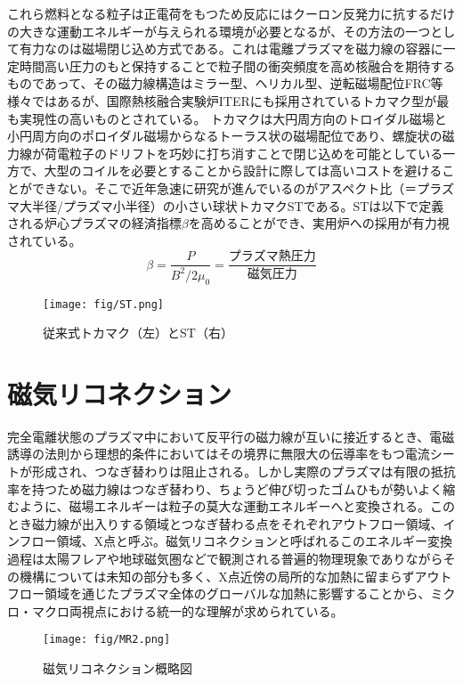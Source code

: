 これら燃料となる粒子は正電荷をもつため反応にはクーロン反発力に抗するだけの大きな運動エネルギーが与えられる環境が必要となるが、その方法の一つとして有力なのは磁場閉じ込め方式である。これは電離プラズマを磁力線の容器に一定時間高い圧力のもと保持することで粒子間の衝突頻度を高め核融合を期待するものであって、その磁力線構造はミラー型、ヘリカル型、逆転磁場配位FRC等様々ではあるが、国際熱核融合実験炉ITERにも採用されているトカマク型が最も実現性の高いものとされている。
トカマクは大円周方向のトロイダル磁場と小円周方向のポロイダル磁場からなるトーラス状の磁場配位であり、螺旋状の磁力線が荷電粒子のドリフトを巧妙に打ち消すことで閉じ込めを可能としている一方で、大型のコイルを必要とすることから設計に際しては高いコストを避けることができない。そこで近年急速に研究が進んでいるのがアスペクト比（＝プラズマ大半径/プラズマ小半径）の小さい球状トカマクSTである。STは以下で定義される炉心プラズマの経済指標$\beta$を高めることができ、実用炉への採用が有力視されている。
\begin{equation}
	\beta=\frac{P}{B^2/2\mu_0}=\frac{プラズマ熱圧力}{磁気圧力}
\end{equation}
\begin{figure}[H]\centering\texttt{[image: fig/ST.png]}
	\caption{従来式トカマク（左）とST（右）}\label{fig:ST1}
\end{figure}

\section{磁気リコネクション}
完全電離状態のプラズマ中において反平行の磁力線が互いに接近するとき、電磁誘導の法則から理想的条件においてはその境界に無限大の伝導率をもつ電流シートが形成され、つなぎ替わりは阻止される。しかし実際のプラズマは有限の抵抗率を持つため磁力線はつなぎ替わり、ちょうど伸び切ったゴムひもが勢いよく縮むように、磁場エネルギーは粒子の莫大な運動エネルギーへと変換される\cite{yamada2010}\cite{onobeta}。このとき磁力線が出入りする領域とつなぎ替わる点をそれぞれアウトフロー領域、インフロー領域、X点と呼ぶ。磁気リコネクションと呼ばれるこのエネルギー変換過程は太陽フレアや地球磁気圏などで観測される普遍的物理現象でありながらその機構については未知の部分も多く、X点近傍の局所的な加熱に留まらずアウトフロー領域を通じたプラズマ全体のグローバルな加熱に影響することから、ミクロ・マクロ両視点における統一的な理解が求められている。
\begin{figure}[H]\centering\texttt{[image: fig/MR2.png]}
	\caption{磁気リコネクション概略図}\label{fig:MR1}
\end{figure}

